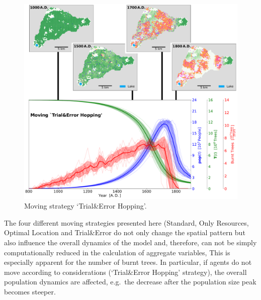 \begin{figure}
	\centering
	\includegraphics[width=1\textwidth]{images/Results/Moving/alphaHopping_EnsembleStatistics+Panels}
	\caption{Moving strategy `Trial\&Error Hopping'.}
	\label{fig:hop}
\end{figure}
The four different moving strategies presented here (Standard, Only Resources, Optimal Location and Trial\&Error do not only change the spatial pattern but also influence the overall dynamics of the model and, therefore, can not be simply computationally reduced in the calculation of aggregate variables,
This is especially apparent for the number of burnt trees.
In particular, if agents do not move according to considerations (`Trial\&Error Hopping' strategy), the overall population dynamics are affected, e.g.\ the decrease after the population size peak becomes steeper.



